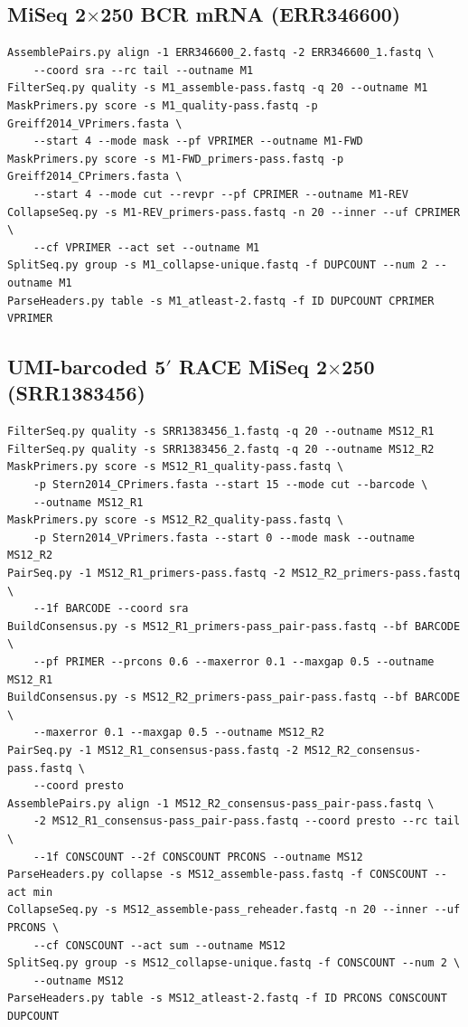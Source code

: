 \documentclass[11pt]{article}
\begin{document}
\subsection*{MiSeq 2$\times$250 BCR mRNA (ERR346600)}

\small
\begin{verbatim}
AssemblePairs.py align -1 ERR346600_2.fastq -2 ERR346600_1.fastq \
    --coord sra --rc tail --outname M1
FilterSeq.py quality -s M1_assemble-pass.fastq -q 20 --outname M1
MaskPrimers.py score -s M1_quality-pass.fastq -p Greiff2014_VPrimers.fasta \
    --start 4 --mode mask --pf VPRIMER --outname M1-FWD
MaskPrimers.py score -s M1-FWD_primers-pass.fastq -p Greiff2014_CPrimers.fasta \
    --start 4 --mode cut --revpr --pf CPRIMER --outname M1-REV
CollapseSeq.py -s M1-REV_primers-pass.fastq -n 20 --inner --uf CPRIMER \
    --cf VPRIMER --act set --outname M1
SplitSeq.py group -s M1_collapse-unique.fastq -f DUPCOUNT --num 2 --outname M1
ParseHeaders.py table -s M1_atleast-2.fastq -f ID DUPCOUNT CPRIMER VPRIMER
\end{verbatim}
\normalsize

\subsection*{UMI-barcoded 5$'$ RACE MiSeq 2$\times$250 (SRR1383456)}

\small
\begin{verbatim}
FilterSeq.py quality -s SRR1383456_1.fastq -q 20 --outname MS12_R1
FilterSeq.py quality -s SRR1383456_2.fastq -q 20 --outname MS12_R2
MaskPrimers.py score -s MS12_R1_quality-pass.fastq \
    -p Stern2014_CPrimers.fasta --start 15 --mode cut --barcode \
    --outname MS12_R1
MaskPrimers.py score -s MS12_R2_quality-pass.fastq \
    -p Stern2014_VPrimers.fasta --start 0 --mode mask --outname MS12_R2
PairSeq.py -1 MS12_R1_primers-pass.fastq -2 MS12_R2_primers-pass.fastq \
    --1f BARCODE --coord sra
BuildConsensus.py -s MS12_R1_primers-pass_pair-pass.fastq --bf BARCODE \
    --pf PRIMER --prcons 0.6 --maxerror 0.1 --maxgap 0.5 --outname MS12_R1
BuildConsensus.py -s MS12_R2_primers-pass_pair-pass.fastq --bf BARCODE \
    --maxerror 0.1 --maxgap 0.5 --outname MS12_R2
PairSeq.py -1 MS12_R1_consensus-pass.fastq -2 MS12_R2_consensus-pass.fastq \
    --coord presto
AssemblePairs.py align -1 MS12_R2_consensus-pass_pair-pass.fastq \
    -2 MS12_R1_consensus-pass_pair-pass.fastq --coord presto --rc tail \
    --1f CONSCOUNT --2f CONSCOUNT PRCONS --outname MS12
ParseHeaders.py collapse -s MS12_assemble-pass.fastq -f CONSCOUNT --act min
CollapseSeq.py -s MS12_assemble-pass_reheader.fastq -n 20 --inner --uf PRCONS \
    --cf CONSCOUNT --act sum --outname MS12
SplitSeq.py group -s MS12_collapse-unique.fastq -f CONSCOUNT --num 2 \
    --outname MS12
ParseHeaders.py table -s MS12_atleast-2.fastq -f ID PRCONS CONSCOUNT DUPCOUNT
\end{verbatim}
\normalsize
\end{document}
